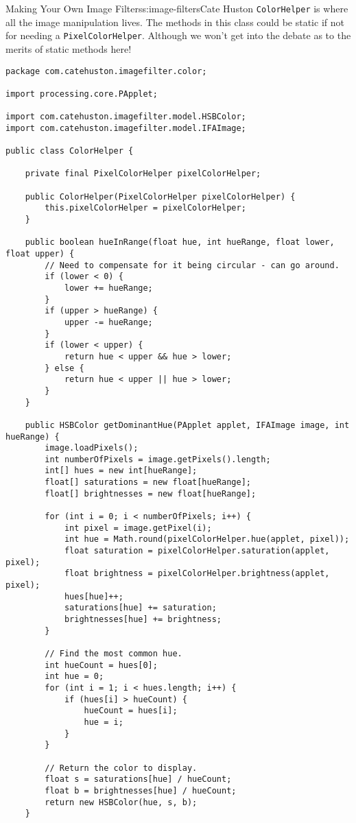 \begin{aosachapter}{Making Your Own Image Filters}{s:image-filters}{Cate Huston}
\texttt{ColorHelper} is where all the image manipulation lives. The
methods in this class could be static if not for needing a
\texttt{PixelColorHelper}. Although we won't get into the debate as to
the merits of static methods here!

\begin{verbatim}
package com.catehuston.imagefilter.color;

import processing.core.PApplet;

import com.catehuston.imagefilter.model.HSBColor;
import com.catehuston.imagefilter.model.IFAImage;

public class ColorHelper {

    private final PixelColorHelper pixelColorHelper;

    public ColorHelper(PixelColorHelper pixelColorHelper) {
        this.pixelColorHelper = pixelColorHelper;
    }

    public boolean hueInRange(float hue, int hueRange, float lower, float upper) {
        // Need to compensate for it being circular - can go around.
        if (lower < 0) {
            lower += hueRange;
        }
        if (upper > hueRange) {
            upper -= hueRange;
        }
        if (lower < upper) {
            return hue < upper && hue > lower;
        } else {
            return hue < upper || hue > lower;
        }
    }

    public HSBColor getDominantHue(PApplet applet, IFAImage image, int hueRange) {
        image.loadPixels();
        int numberOfPixels = image.getPixels().length;
        int[] hues = new int[hueRange];
        float[] saturations = new float[hueRange];
        float[] brightnesses = new float[hueRange];

        for (int i = 0; i < numberOfPixels; i++) {
            int pixel = image.getPixel(i);
            int hue = Math.round(pixelColorHelper.hue(applet, pixel));
            float saturation = pixelColorHelper.saturation(applet, pixel);
            float brightness = pixelColorHelper.brightness(applet, pixel);
            hues[hue]++;
            saturations[hue] += saturation;
            brightnesses[hue] += brightness;
        }

        // Find the most common hue.
        int hueCount = hues[0];
        int hue = 0;
        for (int i = 1; i < hues.length; i++) {
            if (hues[i] > hueCount) {
                hueCount = hues[i];
                hue = i;
            }
        }

        // Return the color to display.
        float s = saturations[hue] / hueCount;
        float b = brightnesses[hue] / hueCount;
        return new HSBColor(hue, s, b);
    }


\end{verbatim}
\end{aosachapter}
